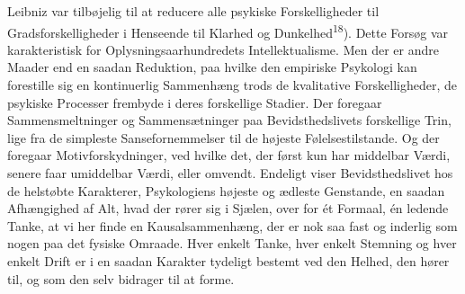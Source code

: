 \documentclass[12pt,a4paper,openany]{book}
\begin{document}
Leibniz var tilbøjelig til at reducere alle psykiske Forskelligheder til
Gradsforskelligheder i Henseende til Klarhed og Dunkelhed\textsuperscript{18}).
Dette Forsøg var karakteristisk for Oplysningsaarhundredets Intellektualisme.
Men der er andre Maader end en saadan Reduktion, paa hvilke den empiriske
Psykologi kan forestille sig en kontinuerlig Sammenhæng trods de kvalitative
Forskelligheder, de psykiske Processer frembyde i deres forskellige Stadier.
Der foregaar Sammensmeltninger og Sammensætninger paa Bevidsthedslivets
forskellige Trin, lige fra de simpleste Sansefornemmelser til de højeste
Følelsestilstande. Og der foregaar Motivforskydninger, ved hvilke det, der
først kun har middelbar Værdi, senere faar umiddelbar Værdi, eller omvendt.
Endeligt viser Bevidsthedslivet hos de helstøbte Karakterer, Psykologiens
højeste og ædleste Genstande, en saadan Afhængighed af Alt, hvad der rører sig
i Sjælen, over for ét Formaal, én ledende Tanke, at vi her finde en
Kausalsammenhæng, der er nok saa fast og inderlig som nogen paa det fysiske
Omraade. Hver enkelt Tanke, hver enkelt Stemning og hver enkelt Drift er i en
saadan Karakter tydeligt bestemt ved den Helhed, den hører til, og som den selv
bidrager til at forme.
\end{document}
